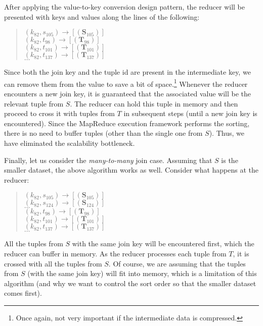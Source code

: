 After applying the value-to-key conversion design pattern, the reducer
will be presented with keys and values along the lines of the
following:

\begin{quote}
$(k_{82}, s_{105}) \rightarrow [(\textbf{S}_{105})]$ \\
$(k_{82}, t_{98}) \rightarrow [(\textbf{T}_{98})]$ \\
$(k_{82}, t_{101}) \rightarrow [(\textbf{T}_{101})]$ \\
$(k_{82}, t_{137}) \rightarrow [(\textbf{T}_{137})]$ \\
$\ldots$
\end{quote}

\noindent Since both the join key and the tuple id are present in the
intermediate key, we can remove them from the value to save a bit of
space.\footnote{Once again, not very important if the intermediate
  data is compressed.}  Whenever the reducer encounters a new join
key, it is guaranteed that the associated value will be the relevant
tuple from $S$.  The reducer can hold this tuple in memory and then
proceed to cross it with tuples from $T$ in subsequent steps (until a
new join key is encountered).  Since the MapReduce execution framework
performs the sorting, there is no need to buffer tuples (other than
the single one from $S$).  Thus, we have eliminated the scalability
bottleneck.

Finally, let us consider the \emph{many-to-many} join case.  Assuming
that $S$ is the smaller dataset, the above algorithm works as well.
Consider what happens at the reducer:

\begin{quote}
$(k_{82}, s_{105}) \rightarrow [(\textbf{S}_{105})]$ \\
$(k_{82}, s_{124}) \rightarrow [(\textbf{S}_{124})]$ \\
$\ldots$ \\
$(k_{82}, t_{98})  \rightarrow [(\textbf{T}_{98})]$ \\
$(k_{82}, t_{101}) \rightarrow [(\textbf{T}_{101})]$ \\
$(k_{82}, t_{137}) \rightarrow [(\textbf{T}_{137})]$ \\
$\ldots$
\end{quote}

\noindent All the tuples from $S$ with the same join key will be
encountered first, which the reducer can buffer in memory.  As the
reducer processes each tuple from $T$, it is crossed with all the
tuples from $S$.  Of course, we are assuming that the tuples from $S$
(with the same join key) will fit into memory, which is a limitation
of this algorithm (and why we want to control the sort order so that
the smaller dataset comes first).

